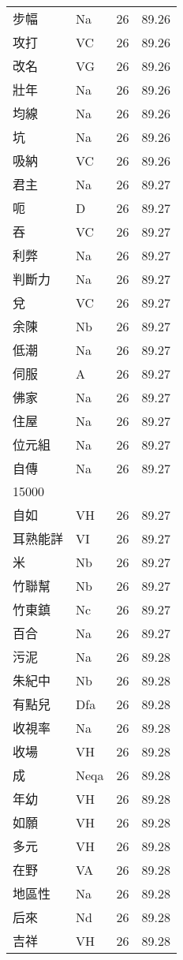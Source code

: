 \documentclass[twocolumn]{book}
\begin{document}
\begin{supertabular}{llrr}
步幅 & Na & 26 &  89.26\\
攻打 & VC & 26 &  89.26\\
改名 & VG & 26 &  89.26\\
壯年 & Na & 26 &  89.26\\
均線 & Na & 26 &  89.26\\
坑 & Na & 26 &  89.26\\
吸納 & VC & 26 &  89.26\\
君主 & Na & 26 &  89.27\\
呃 & D & 26 &  89.27\\
吞 & VC & 26 &  89.27\\
利弊 & Na & 26 &  89.27\\
判斷力 & Na & 26 &  89.27\\
兌 & VC & 26 &  89.27\\
余陳 & Nb & 26 &  89.27\\
低潮 & Na & 26 &  89.27\\
伺服 & A & 26 &  89.27\\
佛家 & Na & 26 &  89.27\\
住屋 & Na & 26 &  89.27\\
位元組 & Na & 26 &  89.27\\
自傳 & Na & 26 &  89.27\\
15000\\
自如 & VH & 26 &  89.27\\
耳熟能詳 & VI & 26 &  89.27\\
米 & Nb & 26 &  89.27\\
竹聯幫 & Nb & 26 &  89.27\\
竹東鎮 & Nc & 26 &  89.27\\
百合 & Na & 26 &  89.27\\
污泥 & Na & 26 &  89.28\\
朱紀中 & Nb & 26 &  89.28\\
有點兒 & Dfa & 26 &  89.28\\
收視率 & Na & 26 &  89.28\\
收場 & VH & 26 &  89.28\\
成 & Neqa & 26 &  89.28\\
年幼 & VH & 26 &  89.28\\
如願 & VH & 26 &  89.28\\
多元 & VH & 26 &  89.28\\
在野 & VA & 26 &  89.28\\
地區性 & Na & 26 &  89.28\\
后來 & Nd & 26 &  89.28\\
吉祥 & VH & 26 &  89.28\\

\end{supertabular}
\end{document}
